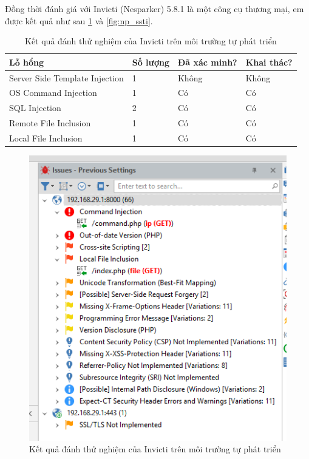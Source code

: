 \documentclass[./../main.tex]{subfiles}
\begin{document}
Đồng thời đánh giá với Invicti (Nesparker) 5.8.1 là một công cụ thương mại,
em được kết quả như sau \ref{fig:np_vulns} và \ref{fig:np_ssti}.
\begin{table}[H]
	\begin{tabular}{|l|l|l|l|}
		\hline
		\textbf{Lỗ hổng}               & \textbf{Số lượng} & \textbf{Đã xác minh?} & \textbf{Khai thác?} \\ \hline
		Server Side Template Injection & 1                 & Không                 & Không               \\ \hline
		OS Command Injection           & 1                 & Có                    & Có                  \\ \hline
		SQL Injection                  & 2                 & Có                    & Có                  \\ \hline
		Remote File Inclusion          & 1                 & Có                    & Có                  \\ \hline
		Local File Inclusion           & 1                 & Có                    & Có                  \\ \hline
	\end{tabular}
	\caption{Kết quả đánh thử nghiệm của Invicti trên môi trường tự phát triển}
\end{table}

\begin{figure}[h!]
	\includegraphics[width=\linewidth]{./images/np_ssti.png}
	\caption{Kết quả đánh thử nghiệm của Invicti trên môi trường tự phát triển}
	\label{fig:np_vulns}
\end{figure}
\end{document}
